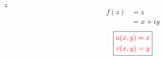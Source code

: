 \item[2.] $z$
\begin{align*}
    f(z) 
    &= z \\
    &= x+iy
\end{align*}
\[
\boxed{
\textcolor{red}{
\begin{aligned}
u(x,y) &= x \\
v(x,y) &= y
\end{aligned}
}
}
\]
